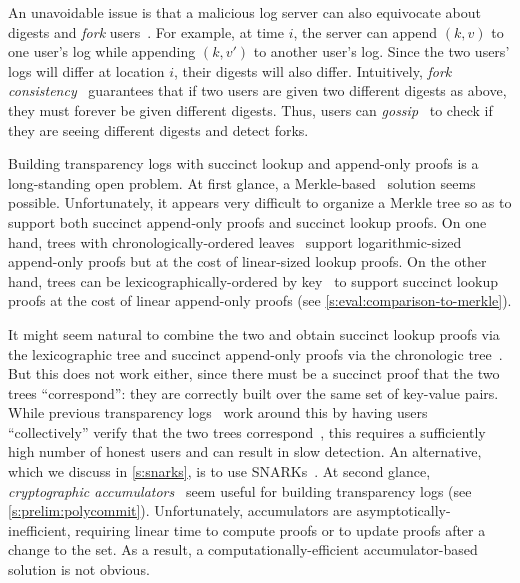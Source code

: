 An unavoidable issue is that a malicious log server can also equivocate about digests and \textit{fork} users~\cite{sundrosdi,ht}.
For example, at time $i$, the server can append $(k,v)$ to one user's log while appending $(k,v')$ to another user's log.
Since the two users' logs will differ at location $i$, their digests will also differ.
Intuitively, \textit{fork consistency}~\cite{beyondonethird,sundrosdi} guarantees that if two users are given two different digests as above, they must forever be given different digests.
Thus, users can \textit{gossip}~\cite{ct-gossip,cosi,catena,DahlbergPullsVestin2018} to check if they are seeing different digests and detect forks.

Building transparency logs with succinct lookup and append-only proofs is a long-standing open problem.
At first glance, a Merkle-based~\cite{merkle} solution seems possible.
Unfortunately, it appears very difficult to organize a Merkle tree so as to support both succinct append-only proofs and succinct lookup proofs.
On one hand, trees with chronologically-ordered leaves~\cite{versum,ht,append-only-skiplists} support logarithmic-sized append-only proofs but at the cost of linear-sized lookup proofs.
On the other hand, trees can be lexicographically-ordered by key~\cite{pads,ad,apad-oprea,BuldasLaudLipmaa2000} to support succinct lookup proofs at the cost of linear append-only proofs (see \cref{s:eval:comparison-to-merkle}).

It might seem natural to combine the two and obtain succinct lookup proofs via the lexicographic tree and succinct append-only proofs via the chronologic tree~\cite{ect}.
But this does not work either, since there must be a succinct proof that the two trees ``correspond'': they are correctly built over the same set of key-value pairs.
While previous transparency logs~\cite{ect,dtki} work around this by having users ``collectively'' verify that the two trees correspond~\cite{ect,dtki,vkd}, this requires a sufficiently high number of honest users and can result in slow detection.
An alternative, which we discuss in \cref{s:snarks}, is to use SNARKs~\cite{qsp,groth16}.
At second glance, \textit{cryptographic accumulators}~\cite{acc-rsa,acc-bilinear} seem useful for building transparency logs (see \cref{s:prelim:polycommit}).
Unfortunately, accumulators are asymptotically-inefficient, requiring linear time to compute proofs or to update proofs after a change to the set.
As a result, a computationally-efficient accumulator-based solution is not obvious.

